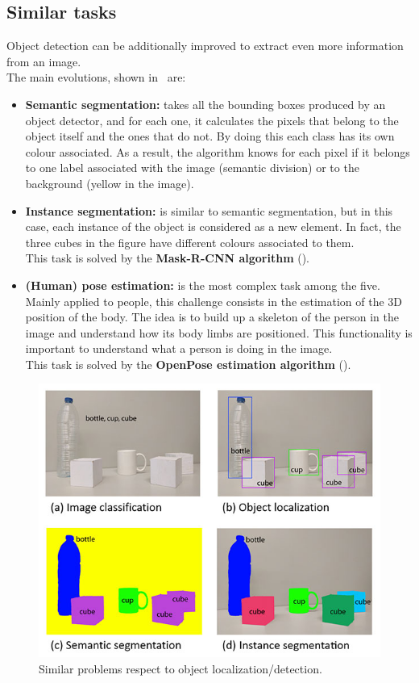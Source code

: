 \subsection{Similar tasks}
Object detection can be additionally improved to extract even more information from an image.\\
The main evolutions, shown in~ are:
\begin{itemize}
	\item \textbf{Semantic segmentation:} takes all the bounding boxes produced by an object detector, and for each one, it calculates the pixels that belong to the object itself and the ones that do not. By doing this each class has its own colour associated. As a result, the algorithm knows for each pixel if it belongs to one label associated with the image (semantic division) or to the background (yellow in the image).
	\item \textbf{Instance segmentation:} is similar to semantic segmentation, but in this case, each instance of the object is considered as a new element. In fact, the three cubes in the figure have different colours associated to them.\\
	This task is solved by the \textbf{Mask-R-CNN algorithm} ().
	\item \textbf{(Human) pose estimation:} is the most complex task among the five. Mainly applied to people, this challenge consists in the estimation of the 3D position of the body. The idea is to build up a skeleton of the person in the image and understand how its body limbs are positioned. This functionality is important to understand what a person is doing in the image.\\
	This task is solved by the \textbf{OpenPose estimation algorithm} ().
\end{itemize}
\begin{figure}[!h]
	\centering
	\includegraphics[width=0.7\linewidth]{images/detection/types-of-img-analysis}
	\caption{Similar problems respect to object localization/detection.}
	\label{fig:imgAnalysisType}
\end{figure}



